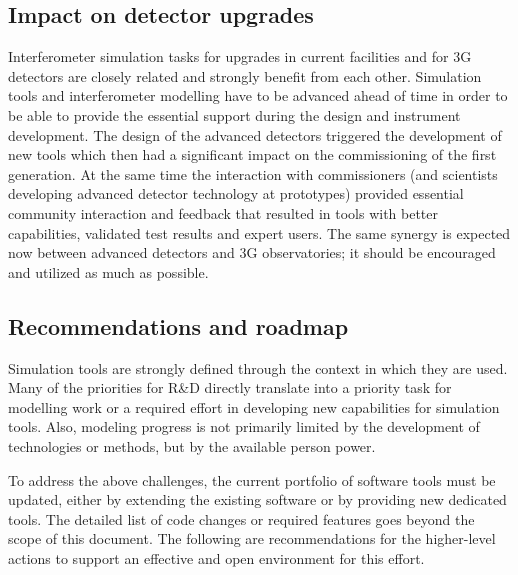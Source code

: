 \subsection{Impact on detector upgrades}
Interferometer simulation tasks for upgrades in current facilities and for 3G detectors are closely related and strongly benefit from each other. Simulation tools and interferometer modelling have to be advanced ahead of time in order to be able to provide the essential
support during the design and instrument development. The design of the advanced detectors triggered the development of new tools which then had a significant impact on the commissioning of the first generation. At the same time the interaction with commissioners (and scientists developing advanced detector
technology at prototypes) provided essential community interaction and feedback that resulted in tools with better capabilities, validated test results and expert users. The same synergy is expected now between advanced detectors and 3G observatories; it should be encouraged and utilized as much as possible.

\subsection{Recommendations and roadmap}
Simulation tools are strongly defined through the context in which they are used. Many of the priorities for R\&D directly translate into a priority task for modelling work or a required effort in developing new capabilities for simulation tools. Also, modeling progress is not primarily limited by the development of technologies or methods, but by the available person power.

To address the above challenges, the current portfolio of software tools must be updated, either by extending the existing software or by providing new dedicated tools. The detailed list of code changes or required features goes beyond the scope of this document. The following are recommendations for the higher-level actions to support an effective and open environment for this effort.

